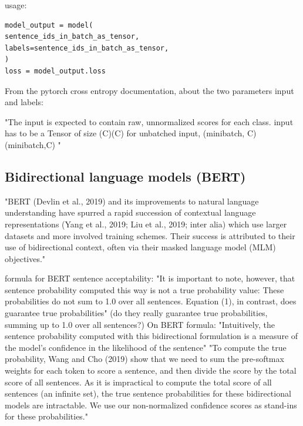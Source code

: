 usage:
\begin{lstlisting}
model_output = model(
sentence_ids_in_batch_as_tensor,
labels=sentence_ids_in_batch_as_tensor,
)
loss = model_output.loss
\end{lstlisting}

From the pytorch cross entropy documentation, about the two parameters input and labels:

"The input is expected to contain raw, unnormalized scores for each class. input has to be a Tensor of size (C)(C) for unbatched input, (minibatch, C)(minibatch,C) "



\pagebreak

\subsection{Bidirectional language models (BERT)}

"BERT (Devlin et al., 2019) and its improvements to natural language understanding have spurred a rapid succession of contextual language representations (Yang et al., 2019; Liu et al., 2019; inter alia) which use larger datasets and more
involved training schemes. Their success is attributed to their use of bidirectional context, often via their masked language model (MLM) objectives." \citet{salazar2020masked}



\citet{lau2020furiously} formula for BERT sentence acceptability:
"It is important to note, however, that
sentence probability computed this way is not
a true probability value: These probabilities do
not sum to 1.0 over all sentences. Equation (1),
in contrast, does guarantee true probabilities" \citep{lau2020furiously}
(do they really guarantee true probabilities, summing up to 1.0 over all sentences?)
On BERT formula:
"Intuitively, the sentence probability computed
with this bidirectional formulation is a measure of the model’s confidence in the likelihood of the
sentence"\citep{lau2020furiously}
"To compute the true probability, Wang and
Cho (2019) show that we need to sum the
pre-softmax weights for each token to score a
sentence, and then divide the score by the total
score of all sentences. As it is impractical to
compute the total score of all sentences (an
infinite set), the true sentence probabilities for
these bidirectional models are intractable. We use
our non-normalized confidence scores as stand-ins
for these probabilities."\citep{lau2020furiously}
 
